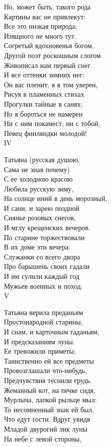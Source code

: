 Но, может быть, такого рода\\
Картины вас не привлекут:\\
Все это низкая природа;\\
Изящного не много тут.\\
Согретый вдохновенья богом,\\
Другой поэт роскошным слогом\\
Живописал нам первый снег\\
И все оттенки зимних нег;\\
Он вас пленит, я в том уверен,\\
Рисуя в пламенных стихах\\
Прогулки тайные в санях;\\
Но я бороться не намерен\\
Ни с ним покамест, ни с тобой,\\
Певец финляндки молодой!\\

IV

Татьяна (русская душою,\\
Сама не зная почему)\\
С ее холодною красою\\
Любила русскую зиму,\\
На солнце иний в день морозный,\\
И сани, и зарею поздной\\
Сиянье розовых снегов,\\
И мглу крещенских вечеров.\\
По старине торжествовали\\
В их доме эти вечера:\\
Служанки со всего двора\\
Про барышень своих гадали\\
И им сулили каждый год\\
Мужьев военных и поход.\\

V

Татьяна верила преданьям\\
Простонародной старины,\\
И снам, и карточным гаданьям,\\
И предсказаниям луны.\\
Ее тревожили приметы;\\
Таинственно ей все предметы\\
Провозглашали что-нибудь,\\
Предчувствия теснили грудь.\\
Жеманный кот, на печке сидя,\\
Мурлыча, лапкой рыльце мыл:\\
То несомненный знак ей был,\\
Что едут гости. Вдруг увидя\\
Младой двурогий лик луны\\
На небе с левой стороны,\\

